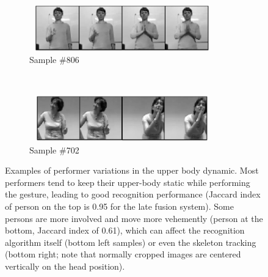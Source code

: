 
\begin{figure}[t]
        \centering
        \begin{subfigure}[c]{.5\textwidth}
        \centering
                \includegraphics[width=8cm,height=2cm, clip]{images/original806}
\vspace*{-2mm}
                \caption{\small{Sample \#806}}
        \end{subfigure}%
        \\
        \begin{subfigure}[c]{0.5\textwidth}
        \centering
                \includegraphics[width=8cm,height=2cm, clip]{images/original702}
\vspace*{-2mm}
                \caption{\small{Sample \#702}}
        \end{subfigure}
\vspace*{-3mm}
  \caption{
\small{Examples of performer variations in the  upper body dynamic.
 Most performers tend to keep their upper-body static while performing the gesture,
leading to good recognition performance (Jaccard index of person on the top is 0.95 for the late fusion system).
%
Some persons are more involved  and move more vehemently (person at the bottom, Jaccard index
of 0.61), which can affect the recognition algorithm itself (bottom left samples) or even the skeleton tracking
(bottom right; note that normally cropped images are centered vertically on the head position).
}
}
\label{fig:bodydynamics}
\end{figure}



